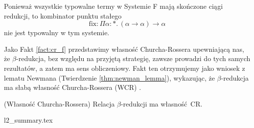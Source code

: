 \begin{wniosek*}
  Ponieważ wszystkie typowalne termy w Systemie F mają skończone ciągi redukcji, to kombinator punktu stałego
  \[ \mathrm{fix} : \Pi \alpha:*.\,(\alpha\to\alpha)\to \alpha \]
nie jest typowalny w tym systemie.
\end{wniosek*}

Jako Fakt \ref{fact:cr_f} przedstawimy własność Churcha-Rossera upewniającą nas, że \(\beta\)-redukcja, bez względu na przyjętą strategię, zawsze prowadzi do tych samych rezultatów, a zatem ma sens obliczeniowy. Fakt ten otrzymujemy jako wniosek z lematu Newmana (Twierdzenie \ref{thm:newman_lemma}), wykazując, że \(\beta\)-redukcja ma słabą własność Churcha-Rossera (WCR) \cite[Twierdzenie 11.2.12]{Urzyczyn2006}.

\begin{fakt}(Własność Churcha-Rossera)\label{fact:cr_f}
  Relacja \(\beta\)-redukcji ma własność CR.
\end{fakt}


{l2_summary.tex}
